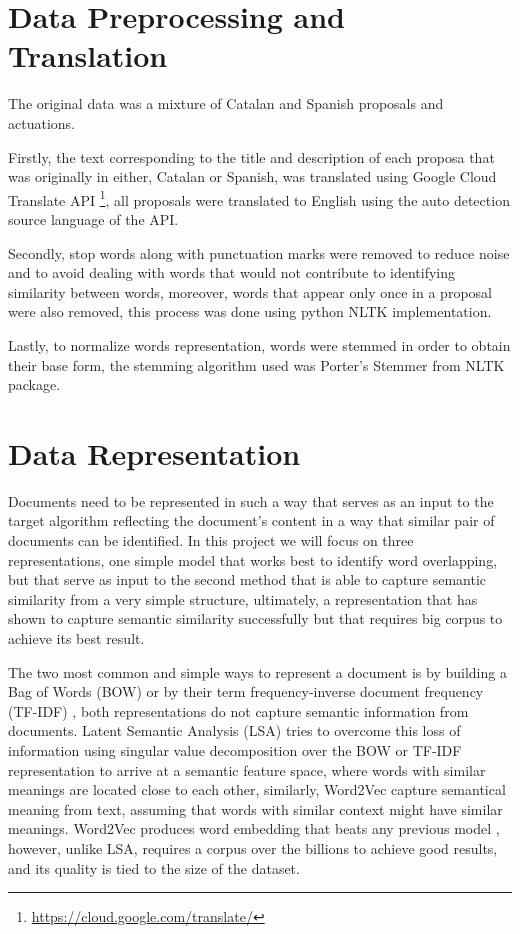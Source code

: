 \section{Data Preprocessing and Translation}
The original data was a mixture of Catalan and Spanish proposals and actuations. 

Firstly, the text corresponding to the title and description of each proposa that was originally in either, Catalan or Spanish, was translated using Google Cloud Translate API \footnote{\url{https://cloud.google.com/translate/}}, all proposals were translated to English using the auto detection source language of the API.

Secondly, stop words along with punctuation marks were removed to reduce noise and to avoid dealing with words that would not contribute to identifying similarity between words, moreover, words that appear only once in a proposal were also removed, this process was done using python NLTK implementation. 

Lastly, to normalize words representation, words were stemmed in order to obtain their base form, the stemming algorithm used was Porter's Stemmer from NLTK package. 

\section{Data Representation}
Documents need to be represented in such a way that serves as an input to the target algorithm reflecting the document's content in a way that similar pair of documents can be identified. In this project we will focus on three representations, one simple model that works best to identify word overlapping, but that serve as input to the second method that is able to capture semantic similarity from a very simple structure, ultimately, a representation that has shown to capture semantic similarity successfully but that requires big corpus to achieve its best result.

The two most common and simple ways to represent a document is by building a Bag of Words (BOW)\cite{vector.space} or by their term frequency-inverse document frequency (TF-IDF) \cite{tfidf}, both representations do not capture semantic information from documents. Latent Semantic Analysis (LSA) \cite{lsa} tries to overcome this loss of information using singular value decomposition over the BOW or TF-IDF representation to arrive at a semantic feature space, where words with similar meanings are located close to each other, similarly,  Word2Vec \cite{mikolov2013} capture semantical meaning from text, assuming that words with similar context might have similar meanings. Word2Vec produces word embedding that beats any previous model \cite{mikolov2013}\cite{wmd}, however, unlike LSA, requires a corpus over the billions to achieve good results, and its quality is tied to the size of the dataset.


